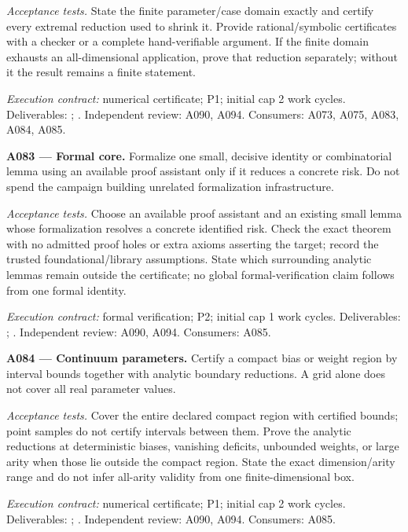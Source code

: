 \documentclass[11pt]{article}
\begin{document}
\emph{Acceptance tests.} State the finite parameter/case domain exactly and certify every extremal reduction used to shrink it. Provide rational/symbolic certificates with a checker or a complete hand-verifiable argument. If the finite domain exhausts an all-dimensional application, prove that reduction separately; without it the result remains a finite statement.

{\small\emph{Execution contract:} numerical certificate; P1; initial cap 2 work cycles. Deliverables: ; . Independent review: A090, A094. Consumers: A073, A075, A083, A084, A085.}

\textbf{A083 --- Formal core.} Formalize one small, decisive identity or combinatorial lemma using an available proof assistant only if it reduces a concrete risk. Do not spend the campaign building unrelated formalization infrastructure.

\emph{Acceptance tests.} Choose an available proof assistant and an existing small lemma whose formalization resolves a concrete identified risk. Check the exact theorem with no admitted proof holes or extra axioms asserting the target; record the trusted foundational/library assumptions. State which surrounding analytic lemmas remain outside the certificate; no global formal-verification claim follows from one formal identity.

{\small\emph{Execution contract:} formal verification; P2; initial cap 1 work cycles. Deliverables: ; . Independent review: A090, A094. Consumers: A085.}

\textbf{A084 --- Continuum parameters.} Certify a compact bias or weight region by interval bounds together with analytic boundary reductions. A grid alone does not cover all real parameter values.

\emph{Acceptance tests.} Cover the entire declared compact region with certified bounds; point samples do not certify intervals between them. Prove the analytic reductions at deterministic biases, vanishing deficits, unbounded weights, or large arity when those lie outside the compact region. State the exact dimension/arity range and do not infer all-arity validity from one finite-dimensional box.

{\small\emph{Execution contract:} numerical certificate; P1; initial cap 2 work cycles. Deliverables: ; . Independent review: A090, A094. Consumers: A085.}
\end{document}
